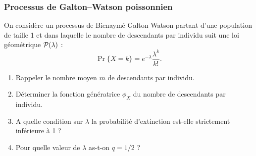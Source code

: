 \subsubsection{Processus de Galton–Watson poissonnien} %
  On considère un processus de Bienaymé-Galton-Watson partant d'une population de taille 1 et dans laquelle le nombre de descendants par individu suit une loi géométrique $\mathcal{P}(\lambda)$ :
  $$
  \Pr\{X = k\} = e^{-\lambda} \frac{\lambda^k}{k!}.
  $$
  \begin{enumerate}
    \item Rappeler le nombre moyen $m$ de descendants par individu.
    \item Déterminer la fonction génératrice $\phi_X$ du nombre de descendants par individu.
    \item A quelle condition sur $\lambda$ la probabilité d'extinction est-elle strictement inférieure à 1 ?
    \item Pour quelle valeur de $\lambda$ as-t-on $q = 1/2$ ?
  \end{enumerate}
